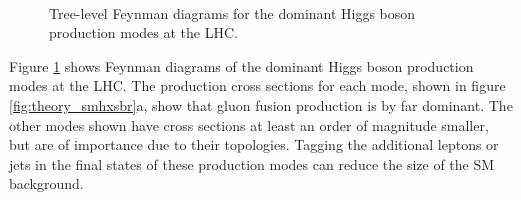 \begin{figure}[h!]
\begin{center}
~\\
\end{center}
\caption[Tree-level Feynman diagrams for the dominant Higgs boson production modes at the LHC.]{Tree-level Feynman diagrams for the dominant Higgs boson production modes at
the \ac{LHC}.}
\label{fig:theory_smhprod}
\end{figure}

Figure \ref{fig:theory_smhprod} shows Feynman diagrams of the dominant Higgs boson production modes
at the \ac{LHC}. The production cross sections for each mode, shown in figure
\ref{fig:theory_smhxsbr}a, show that gluon fusion production is by far dominant. The other modes
shown have cross sections at least an order of magnitude smaller, but are of importance due to their topologies.
Tagging the additional leptons or jets in the final states of
these production modes can reduce the size
of the \ac{SM} background.

